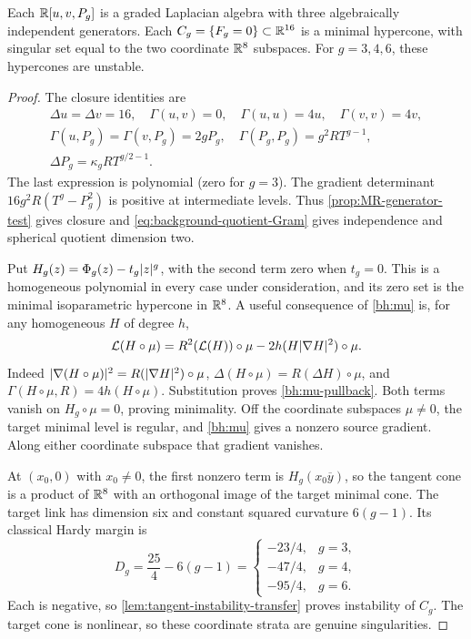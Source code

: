 \begin{proposition}\label{bh:octonionic}
Each $\mathbb R[u,v,P_g]$ is a graded Laplacian algebra with three
algebraically independent generators. Each $C_g=\{F_g=0\}\subset\mathbb R^{16}$
is a minimal hypercone, with singular set equal to the two coordinate
$\mathbb R^8$ subspaces. For $g=3,4,6$, these hypercones are unstable.
\end{proposition}
\begin{proof}
The closure identities are
\begin{gather}\label{bh:higher-table}
 \Delta u=\Delta v=16,\quad\Gamma(u,v)=0,\quad
 \Gamma(u,u)=4u,\quad\Gamma(v,v)=4v,\\
 \Gamma(u,P_g)=\Gamma(v,P_g)=2gP_g,\quad
 \Gamma(P_g,P_g)=g^2RT^{g-1},\nonumber\\
 \Delta P_g=\kappa_gRT^{g/2-1}.\nonumber
\end{gather}
The last expression is polynomial (zero for $g=3$).
The gradient determinant $16g^2R(T^g-P_g^2)$ is positive at
intermediate levels. Thus \cref{prop:MR-generator-test} gives
closure and \eqref{eq:background-quotient-Gram} gives independence
and spherical quotient dimension two.

Put $H_g(z)=\Phi_g(z)-t_g\lvert z\rvert^g$, with the second term zero when
$t_g=0$. This is a homogeneous polynomial in every case under
consideration, and its zero set is the minimal isoparametric
hypercone in $\mathbb R^8$. A useful consequence of \eqref{bh:mu} is, for any
homogeneous $H$ of degree $h$,
\begin{equation}\label{bh:mu-pullback}
 \mathcal L(H\circ\mu)=R^2(\mathcal L(H))\circ\mu
                    -2h(H\lvert \nabla H\rvert^2)\circ\mu.
\end{equation}
Indeed $\lvert \nabla(H\circ\mu)\rvert^2=R(\lvert \nabla H\rvert^2)\circ\mu$,
$\Delta(H\circ\mu)=R(\Delta H)\circ\mu$, and
$\Gamma(H\circ\mu,R)=4h(H\circ\mu)$. Substitution proves
\eqref{bh:mu-pullback}. Both terms vanish on $H_g\circ\mu=0$, proving
minimality. Off the coordinate subspaces $\mu\ne0$, the target
minimal level is regular, and \eqref{bh:mu} gives a nonzero source
gradient. Along either coordinate subspace that gradient vanishes.

At $(x_0,0)$ with $x_0\ne0$, the first nonzero term is
$H_g(x_0\overline y)$, so the tangent cone is a product of $\mathbb R^8$
with an orthogonal image of the target minimal cone. The target
link has dimension six and constant squared curvature $6(g-1)$.
Its classical Hardy margin is
\[
 D_g=\frac{25}{4}-6(g-1)=
 \begin{cases}-23/4,&g=3,\\-47/4,&g=4,\\-95/4,&g=6.
 \end{cases}
\]
Each is negative, so \cref{lem:tangent-instability-transfer}
proves instability of $C_g$. The target cone
is nonlinear, so these coordinate strata are genuine singularities.
\end{proof}

